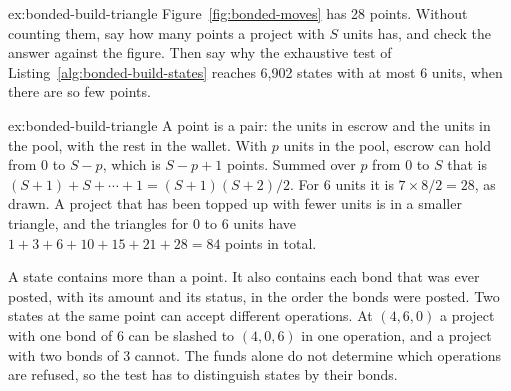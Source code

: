 \documentclass[11pt,a4paper]{article}
\theoremstyle{definition}
\theoremstyle{remark}
\begin{document}
\begin{pdexercise}[kind=Check,rating=1]{ex:bonded-build-triangle}
Figure~\ref{fig:bonded-moves} has 28 points. Without counting them, say how many points a project with $S$ units has, and check the answer against the figure. Then say why the exhaustive test of Listing~\ref{alg:bonded-build-states} reaches 6,902 states with at most 6 units, when there are so few points.
\end{pdexercise}
\begin{pdsolution}{ex:bonded-build-triangle}
A point is a pair: the units in escrow and the units in the pool, with the rest in the wallet. With $p$ units in the pool, escrow can hold from 0 to $S-p$, which is $S-p+1$ points. Summed over $p$ from 0 to $S$ that is $(S+1)+S+\cdots+1=(S+1)(S+2)/2$. For 6 units it is $7\times 8/2=28$, as drawn. A project that has been topped up with fewer units is in a smaller triangle, and the triangles for 0 to 6 units have $1+3+6+10+15+21+28=84$ points in total.

A state contains more than a point. It also contains each bond that was ever posted, with its amount and its status, in the order the bonds were posted. Two states at the same point can accept different operations. At $(4,6,0)$ a project with one bond of 6 can be slashed to $(4,0,6)$ in one operation, and a project with two bonds of 3 cannot. The funds alone do not determine which operations are refused, so the test has to distinguish states by their bonds.
\end{pdsolution}
\end{document}
